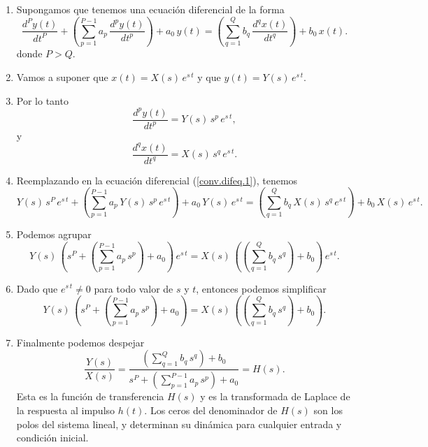 \begin{enumerate}
	\item Supongamos que tenemos una ecuación diferencial de la forma
      \begin{equation}
	\frac{d^{P}y\left( t\right) }{dt^{P}} +
	\left(\sum_{p=1}^{P-1}a_{p} \, \frac{d^{p}y\left( t\right) }{dt^{p}}\right) + 
	a_{0} \, y(t) =
	\left(\sum_{q=1}^{Q}b_{q} \, \frac{d^{q}x\left( t\right) }{dt^{q}}\right) + 
	b_{0} \, x(t). \label{conv.difeq.1}
   \end{equation}
    donde $P > Q$.
	
	\item Vamos a suponer que $x(t) = X(s) \, e^{s \, t}$ y que $y(t) = Y(s) \, e^{s \, t}$.
	
	\item Por lo tanto
	\begin{equation}
		\frac{d^{p}y\left( t\right) }{dt^{p}} = Y(s) \, s^{p} \, e^{s \, t},
	\end{equation}
y
\begin{equation}
	\frac{d^{q}x\left( t\right) }{dt^{q}} = X(s) \, s^{q} \, e^{s \, t}.
\end{equation}
	\item Reemplazando en la ecuación diferencial (\ref{conv.difeq.1}), tenemos
      \begin{equation}
	Y(s) \, s^{P} \, e^{s \, t} +
	\left(\sum_{p=1}^{P-1}a_{p} \, Y(s) \, s^{p} \, e^{s \, t}\right) + 
	a_{0} \, Y(s) \, e^{s \, t} =
	\left(\sum_{q=1}^{Q}b_{q} \, X(s) \, s^{q} \, e^{s \, t}\right) + 
	b_{0} \, X(s) \, e^{s \, t}. \label{conv.difeq.2}
\end{equation}
	
\item Podemos agrupar
      \begin{equation}
	Y(s) \, \left(s^{P}  +
	\left(\sum_{p=1}^{P-1}a_{p} \, s^{p}\right) + 
	a_{0} \right) \, e^{s \, t} =
	X(s) \, \left(\left(\sum_{q=1}^{Q}b_{q} \, s^{q}\right) + 
	b_{0} \right) \, e^{s \, t}. \label{conv.difeq.3}
\end{equation}

\item Dado que $e^{s \, t} \neq 0$ para todo valor de $s$ y $t$, entonces podemos simplificar
      \begin{equation}
	Y(s) \, \left(s^{P}  +
	\left(\sum_{p=1}^{P-1}a_{p} \, s^{p}\right) + 
	a_{0} \right) =
	X(s) \, \left(\left(\sum_{q=1}^{Q}b_{q} \, s^{q}\right) + 
	b_{0} \right). \label{conv.difeq.4}
\end{equation}

\item Finalmente podemos despejar
\begin{equation}
	\frac{Y(s)}{X(s)} = \frac{\left(\sum_{q=1}^{Q}b_{q} \, s^{q}\right) + 
		b_{0}}{s^{P}  +
		\left(\sum_{p=1}^{P-1}a_{p} \, s^{p}\right) + 
		a_{0}} = H(s). \label{conv.difeq.5}
\end{equation}
Esta es la función de transferencia $H(s)$ y es la transformada de Laplace de la respuesta al impulso $h(t)$. Los ceros del denominador de $H(s)$ son los polos del sistema lineal,
y determinan su dinámica para cualquier entrada y condición inicial.

\end{enumerate}

